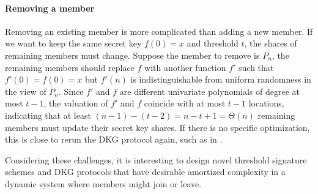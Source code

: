 \paragraph{Removing a member} 
Removing an existing member is more complicated than adding a new member. If we want to keep the same secret key $f(0)=x$ and threshold $t$, the shares of remaining members must change. Suppose the member to remove is $P_n$, the remaining members should replace $f$ with another function $f'$ such that $f'(0)=f(0)=x$ but $f'(n)$ is indistinguishable from uniform randomness in the view of $P_n$. Since $f'$ and $f$ are different univariate polynomials of degree at most $t-1$, the valuation of $f'$ and $f$ coincide with at most $t-1$ locations, indicating that at least $(n-1)-(t-2) = n-t+1 = \Theta(n)$ remaining members must update their secret key shares. If there is no specific optimization, this is close to rerun the DKG protocol again, such as in \cite{DBLP:journals/npa/NoackS09}. 

Considering these challenges, it is interesting to design novel threshold signature schemes and DKG protocols that have desirable amortized complexity in a dynamic system where members might join or leave. 

